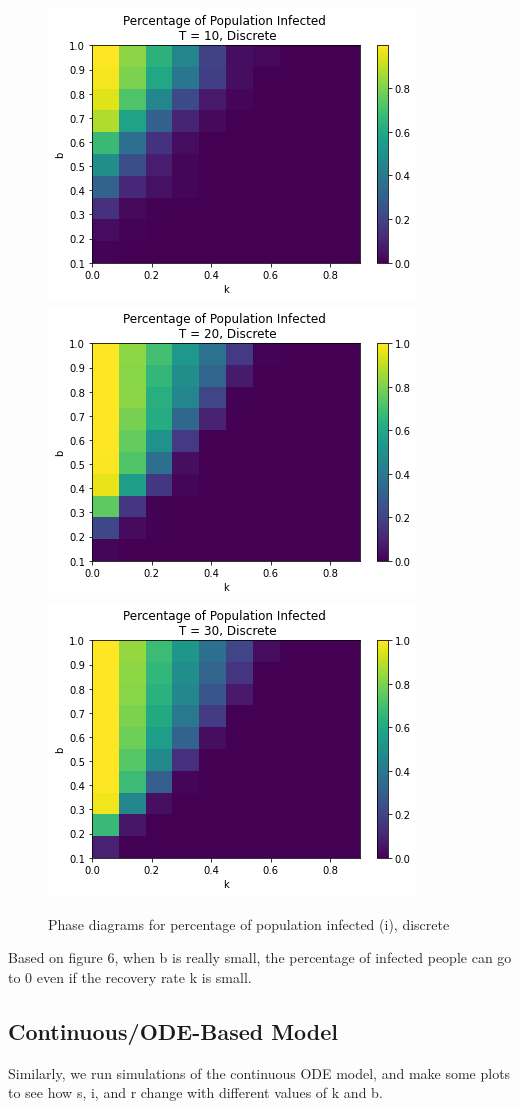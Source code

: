 \documentclass{article}
\begin{document}
\begin{figure}[htp]

\centering
\includegraphics[width=.3\textwidth]{Figure1_discrete_bsmall_infectT10.png}\hfill
\includegraphics[width=.3\textwidth]{Figure1_discrete_bsmall_infectT20.png}\hfill
\includegraphics[width=.3\textwidth]{Figure1_discrete_bsmall_infectT30.png}

\caption{Phase diagrams for percentage of population infected (i), discrete}
\label{fig:figure6}

\end{figure}

Based on figure 6, when b is really small, the percentage of infected people can go to 0 even if the recovery rate k is small.




\subsection{Continuous/ODE-Based Model}

Similarly, we run simulations of the continuous ODE model, and make some plots to see how s, i, and r change with different values of k and b.
\end{document}
